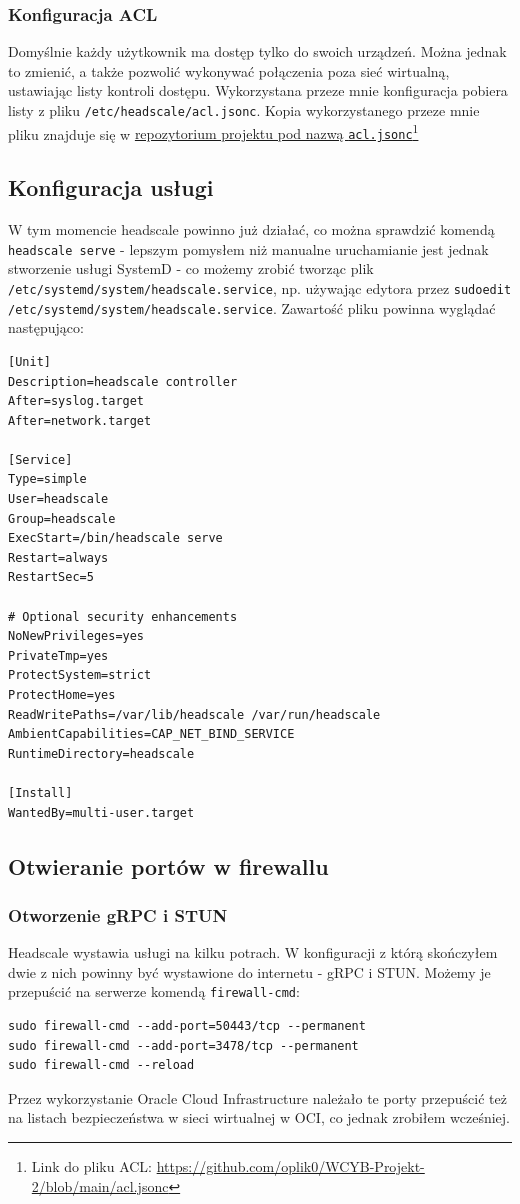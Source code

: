 \documentclass{report}
\numberwithin{equation}{section}
\begin{document}
\subsubsection{Konfiguracja ACL}
Domyślnie każdy użytkownik ma dostęp tylko do swoich urządzeń. Można jednak to zmienić, a także pozwolić wykonywać połączenia poza sieć wirtualną, ustawiając listy kontroli dostępu. Wykorzystana przeze mnie konfiguracja pobiera listy z pliku \texttt{/etc/headscale/acl.jsonc}. Kopia wykorzystanego przeze mnie pliku znajduje się w \href{https://github.com/oplik0/WCYB-Projekt-2/blob/main/acl.jsonc}{repozytorium projektu pod nazwą \texttt{acl.jsonc}}\footnote{Link do pliku ACL: \url{https://github.com/oplik0/WCYB-Projekt-2/blob/main/acl.jsonc}}
\begin{samepage}
\subsection{Konfiguracja usługi}
W tym momencie headscale powinno już działać, co można sprawdzić komendą \texttt{headscale serve} - lepszym pomysłem niż manualne uruchamianie jest jednak stworzenie usługi SystemD - co możemy zrobić tworząc plik \texttt{/etc/systemd/system/headscale.service}, np. używając edytora przez \texttt{sudoedit /etc/systemd/system/headscale.service}.
Zawartość pliku powinna wyglądać następująco:
\begin{verbatim}
[Unit]
Description=headscale controller
After=syslog.target
After=network.target

[Service]
Type=simple
User=headscale
Group=headscale
ExecStart=/bin/headscale serve
Restart=always
RestartSec=5

# Optional security enhancements
NoNewPrivileges=yes
PrivateTmp=yes
ProtectSystem=strict
ProtectHome=yes
ReadWritePaths=/var/lib/headscale /var/run/headscale
AmbientCapabilities=CAP_NET_BIND_SERVICE
RuntimeDirectory=headscale

[Install]
WantedBy=multi-user.target
\end{verbatim}
\end{samepage}

\subsection{Otwieranie portów w firewallu}
\subsubsection{Otworzenie gRPC i STUN}
Headscale wystawia usługi na kilku potrach. W konfiguracji z którą skończyłem dwie z nich powinny być wystawione do internetu - gRPC i STUN. Możemy je przepuścić na serwerze komendą \texttt{firewall-cmd}:
\begin{verbatim}
sudo firewall-cmd --add-port=50443/tcp --permanent
sudo firewall-cmd --add-port=3478/tcp --permanent
sudo firewall-cmd --reload
\end{verbatim}
Przez wykorzystanie Oracle Cloud Infrastructure należało te porty przepuścić też na listach bezpieczeństwa w sieci wirtualnej w OCI, co jednak zrobiłem wcześniej.
\end{document}
